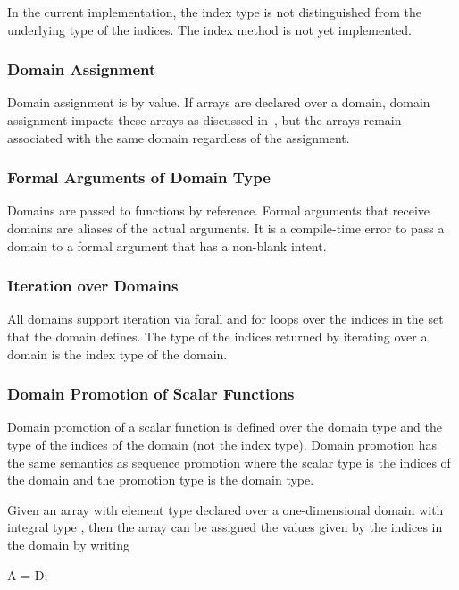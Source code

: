 \begin{implementation}
In the current implementation, the index type is not distinguished
from the underlying type of the indices.  The index method is not yet
implemented.
\end{implementation}

\subsubsection{Domain Assignment}
\label{Domain_Assignment}

Domain assignment is by value.  If arrays are declared over a domain,
domain assignment impacts these arrays as discussed
in~, but the arrays remain
associated with the same domain regardless of the assignment.

\subsubsection{Formal Arguments of Domain Type}
\label{Formal_Arguments_of_Domain_Type}

Domains are passed to functions by reference.  Formal arguments that
receive domains are aliases of the actual arguments.  It is a
compile-time error to pass a domain to a formal argument that has a
non-blank intent.

\subsubsection{Iteration over Domains}
\label{Iteration_over_Domains}

All domains support iteration via forall and for loops over the
indices in the set that the domain defines.  The type of the indices
returned by iterating over a domain is the index type of the domain.

\subsubsection{Domain Promotion of Scalar Functions}
\label{Domain_Promotion_of_Scalar_Functions}

Domain promotion of a scalar function is defined over the domain type
and the type of the indices of the domain (not the index type).
Domain promotion has the same semantics as sequence promotion where
the scalar type is the indices of the domain and the promotion type is
the domain type.

\begin{example}
Given an array  with element type  declared over a
one-dimensional domain  with integral type , then
the array can be assigned the values given by the indices in the
domain by writing
\begin{chapel}
A = D;
\end{chapel}
\end{example}

